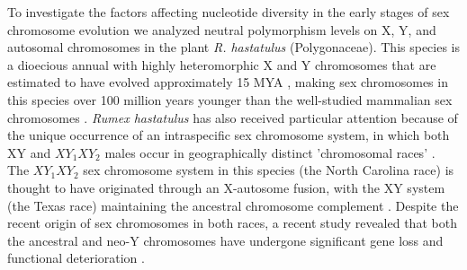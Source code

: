\documentclass[9pt,twocolumn,twoside]{gsajnl}
\begin{document}


To investigate the factors affecting nucleotide diversity in the early stages of sex chromosome evolution we analyzed neutral polymorphism levels on X, Y, and autosomal chromosomes in the plant \textit{R. hastatulus }(Polygonaceae). This species is a dioecious annual with highly heteromorphic X and Y chromosomes that are estimated to have evolved  approximately 15 MYA \citep{quesada2011,grabowska2015,navajas2005}, making sex chromosomes in this species over 100 million years younger than the well-studied mammalian sex chromosomes \citep{lahn1999,ross2005dna}. \textit{Rumex hastatulus} has also received particular attention because of the unique occurrence of an intraspecific sex chromosome system, in which both XY and $XY_{1}XY_{2}$ males occur in geographically distinct 'chromosomal races' \citep{smith1963mechanism}. The $XY_{1}XY_{2}$ sex chromosome system in this species (the North Carolina race) is thought to have originated through an X-autosome fusion, with the XY system (the Texas race) maintaining the ancestral chromosome complement \citep{smith1964evolving}. Despite the recent origin of sex chromosomes in both races, a recent study revealed that both the ancestral and neo-Y chromosomes have undergone significant gene loss and functional deterioration \citep{hough2014}.
\end{document}
